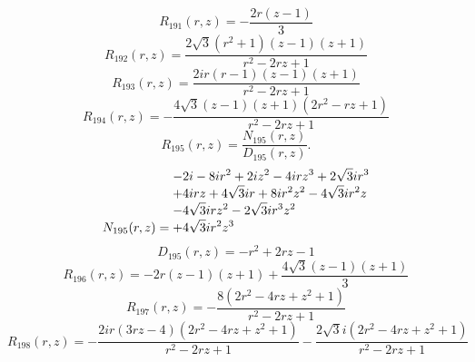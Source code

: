 \documentclass[11pt,a4paper]{article}
\begin{document}
\begin{equation}
R_{191}(r,z)=- \frac{2 r \left(z - 1\right)}{3}
\label{eq:cat-rational-191}
\end{equation}
\begin{equation}
R_{192}(r,z)=\frac{2 \sqrt{3} \left(r^{2} + 1\right) \left(z - 1\right) \left(z + 1\right)}{r^{2} - 2 r z + 1}
\label{eq:cat-rational-192}
\end{equation}
\begin{equation}
R_{193}(r,z)=\frac{2 i r \left(r - 1\right) \left(z - 1\right) \left(z + 1\right)}{r^{2} - 2 r z + 1}
\label{eq:cat-rational-193}
\end{equation}
\begin{equation}
R_{194}(r,z)=- \frac{4 \sqrt{3} \left(z - 1\right) \left(z + 1\right) \left(2 r^{2} - r z + 1\right)}{r^{2} - 2 r z + 1}
\label{eq:cat-rational-194}
\end{equation}
\begin{equation}
R_{195}(r,z)=\frac{N_{195}(r,z)}{D_{195}(r,z)}.
\label{eq:cat-rational-195}
\end{equation}
\begin{equation}
N_{195}(r,z)=\shortstack[l]{$\displaystyle  - 2 i - 8 i r^{2} + 2 i z^{2} - 4 i r z^{3} + 2 \sqrt{3} i r^{3}$\\
$\displaystyle  + 4 i r z + 4 \sqrt{3} i r + 8 i r^{2} z^{2} - 4 \sqrt{3} i r^{2} z$\\
$\displaystyle  - 4 \sqrt{3} i r z^{2} - 2 \sqrt{3} i r^{3} z^{2}$\\
$\displaystyle  + 4 \sqrt{3} i r^{2} z^{3}$}
\label{eq:cat-numerator-195}
\end{equation}
\begin{equation}
D_{195}(r,z)=- r^{2} + 2 r z - 1
\label{eq:cat-denominator-195}
\end{equation}
\begin{equation}
R_{196}(r,z)=- 2 r \left(z - 1\right) \left(z + 1\right) + \frac{4 \sqrt{3} \left(z - 1\right) \left(z + 1\right)}{3}
\label{eq:cat-rational-196}
\end{equation}
\begin{equation}
R_{197}(r,z)=- \frac{8 \left(2 r^{2} - 4 r z + z^{2} + 1\right)}{r^{2} - 2 r z + 1}
\label{eq:cat-rational-197}
\end{equation}
\begin{equation}
R_{198}(r,z)=- \frac{2 i r \left(3 r z - 4\right) \left(2 r^{2} - 4 r z + z^{2} + 1\right)}{r^{2} - 2 r z + 1} - \frac{2 \sqrt{3} i \left(2 r^{2} - 4 r z + z^{2} + 1\right)}{r^{2} - 2 r z + 1}
\label{eq:cat-rational-198}
\end{equation}
\end{document}
